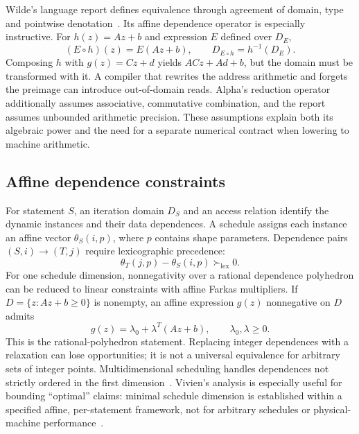 \documentclass[final,3p,times,authoryear]{elsarticle}
\begin{document}
Wilde's language report defines equivalence through agreement of domain, type and pointwise denotation~\citep{alpha1994}. Its affine dependence operator is especially instructive. For $h(z)=Az+b$ and expression $E$ defined over $D_E$,
\begin{equation}\label{eq:alpha-domain}
 (E\circ h)(z)=E(Az+b),\qquad D_{E\circ h}=h^{-1}(D_E).
\end{equation}
Composing $h$ with $g(z)=Cz+d$ yields $ACz+Ad+b$, but the domain must be transformed with it. A compiler that rewrites the address arithmetic and forgets the preimage can introduce out-of-domain reads. Alpha's reduction operator additionally assumes associative, commutative combination, and the report assumes unbounded arithmetic precision. These assumptions explain both its algebraic power and the need for a separate numerical contract when lowering to machine arithmetic.

\subsection{Affine dependence constraints}
For statement $S$, an iteration domain $D_S$ and an access relation identify the dynamic instances and their data dependences. A schedule assigns each instance an affine vector $\theta_S(i,p)$, where $p$ contains shape parameters. Dependence pairs $(S,i)\to(T,j)$ require lexicographic precedence:
\begin{equation}
 \theta_T(j,p)-\theta_S(i,p)\succ_{\mathrm{lex}}0.
\end{equation}
For one schedule dimension, nonnegativity over a rational dependence polyhedron can be reduced to linear constraints with affine Farkas multipliers. If $D=\{z:Az+b\ge0\}$ is nonempty, an affine expression $g(z)$ nonnegative on $D$ admits
\begin{equation}
 g(z)=\lambda_0+\lambda^T(Az+b),\qquad\lambda_0,\lambda\ge0.
\end{equation}
This is the rational-polyhedron statement. Replacing integer dependences with a relaxation can lose opportunities; it is not a universal equivalence for arbitrary sets of integer points. Multidimensional scheduling handles dependences not strictly ordered in the first dimension~\citep{feautrier1992a,feautrier1992b}. Vivien's analysis is especially useful for bounding ``optimal'' claims: minimal schedule dimension is established within a specified affine, per-statement framework, not for arbitrary schedules or physical-machine performance~\citep{vivien2002}.
\end{document}
